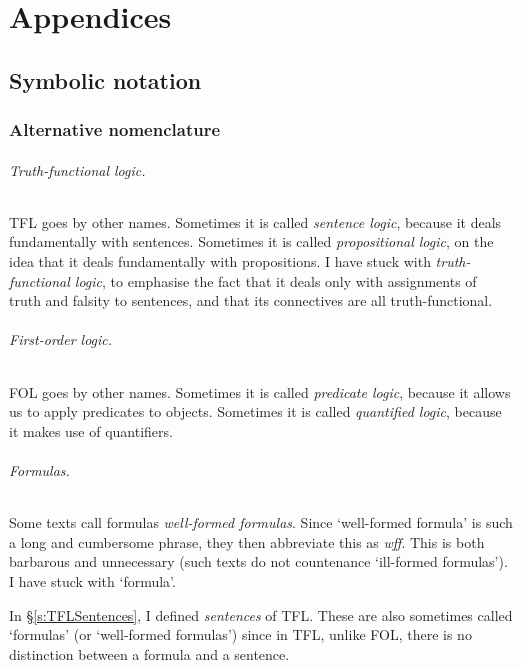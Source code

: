 \part*{Appendices}

\chapter{Symbolic notation}\label{app.notation}

\section{Alternative nomenclature}
\paragraph{Truth-functional logic.} TFL goes by other names. Sometimes it is called \emph{sentence logic}, because it deals fundamentally with sentences. Sometimes it is called \emph{propositional logic}, on the idea that it deals fundamentally with propositions. I have stuck with \emph{truth-functional logic}, to emphasise the fact that it deals only with assignments of truth and falsity to sentences, and that its connectives are all truth-functional.

\paragraph{First-order logic.} FOL goes by other names. Sometimes it is called \emph{predicate logic}, because it allows us to apply  predicates to objects. Sometimes it is called \emph{quantified logic}, because it makes use of quantifiers.

\paragraph{Formulas.} Some texts call formulas \emph{well-formed formulas}. Since `well-formed formula' is such a long and cumbersome phrase, they then abbreviate this as \emph{wff}. This is both barbarous and unnecessary (such texts do not countenance `ill-formed formulas'). I have stuck with `formula'. 

In \S\ref{s:TFLSentences}, I defined \emph{sentences} of TFL. These are also sometimes called `formulas' (or `well-formed formulas') since in TFL, unlike FOL, there is no distinction between a formula and a sentence.

